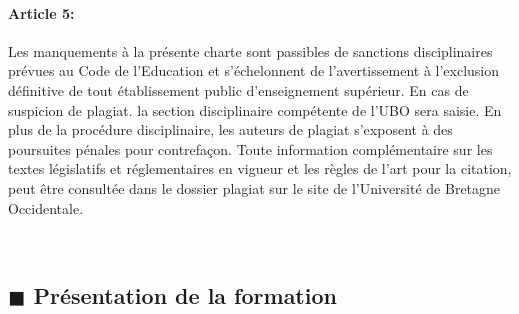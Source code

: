 \documentclass[11pt]{article}
\newcommand{\mysubsection}[1]
{~\\
{\noindent
\begin{minipage}{\linewidth}
\subsection*{$\blacksquare$ #1}
\end{minipage}
}
}
\begin{document}
\begin{multicols*}{2}
\paragraph{Article 5:} Les manquements à la présente charte sont passibles de sanctions disciplinaires prévues au Code de l'Education et s'échelonnent de l'avertissement à l'exclusion définitive de tout établissement public d'enseignement supérieur. En cas de suspicion de plagiat. la section disciplinaire compétente de l'UBO sera saisie.
En plus de la procédure disciplinaire, les auteurs de plagiat s'exposent à des poursuites pénales pour contrefaçon. Toute information complémentaire sur les textes législatifs et réglementaires en vigueur et les règles de l'art pour la citation, peut être consultée dans le dossier plagiat sur le site de l'Université de Bretagne Occidentale.
\end{multicols*}

\newpage


\mysubsection{Présentation de la formation}
\vspace{-0.5cm}
\end{document}
